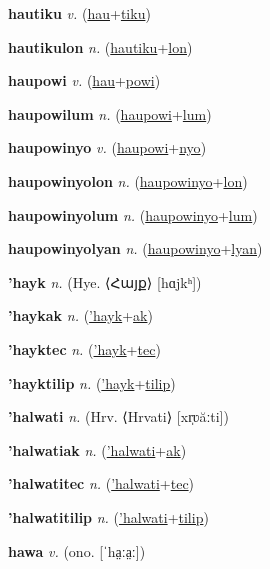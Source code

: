 \textbf{\hypertarget{hautiku}{hautiku}} \textit{v.} (\hyperlink{hau}{hau}+\allowbreak \hyperlink{tiku}{tiku})


\textbf{\hypertarget{hautikulon}{hautikulon}} \textit{n.} (\hyperlink{hautiku}{hautiku}+\allowbreak \hyperlink{lon}{lon})


\textbf{\hypertarget{haupowi}{haupowi}} \textit{v.} (\hyperlink{hau}{hau}+\allowbreak \hyperlink{powi}{powi})


\textbf{\hypertarget{haupowilum}{haupowilum}} \textit{n.} (\hyperlink{haupowi}{haupowi}+\allowbreak \hyperlink{lum}{lum})


\textbf{\hypertarget{haupowinyo}{haupowinyo}} \textit{v.} (\hyperlink{haupowi}{haupowi}+\allowbreak \hyperlink{nyo}{nyo})


\textbf{\hypertarget{haupowinyolon}{haupowinyolon}} \textit{n.} (\hyperlink{haupowinyo}{haupowinyo}+\allowbreak \hyperlink{lon}{lon})


\textbf{\hypertarget{haupowinyolum}{haupowinyolum}} \textit{n.} (\hyperlink{haupowinyo}{haupowinyo}+\allowbreak \hyperlink{lum}{lum})


\textbf{\hypertarget{haupowinyolyan}{haupowinyolyan}} \textit{n.} (\hyperlink{haupowinyo}{haupowinyo}+\allowbreak \hyperlink{lyan}{lyan})


\textbf{\hypertarget{'hayk}{'hayk}} \textit{n.} (Hye. ⟨{\armenian{}Հայք}⟩ [hɑjkʰ])


\textbf{\hypertarget{'haykak}{'haykak}} \textit{n.} (\hyperlink{'hayk}{'hayk}+\allowbreak \hyperlink{ak}{ak})


\textbf{\hypertarget{'hayktec}{'hayktec}} \textit{n.} (\hyperlink{'hayk}{'hayk}+\allowbreak \hyperlink{tec}{tec})


\textbf{\hypertarget{'hayktilip}{'hayktilip}} \textit{n.} (\hyperlink{'hayk}{'hayk}+\allowbreak \hyperlink{tilip}{tilip})


\textbf{\hypertarget{'halwati}{'halwati}} \textit{n.} (Hrv. ⟨Hrvati⟩ [xr̩ʋăːti])


\textbf{\hypertarget{'halwatiak}{'halwatiak}} \textit{n.} (\hyperlink{'halwati}{'halwati}+\allowbreak \hyperlink{ak}{ak})


\textbf{\hypertarget{'halwatitec}{'halwatitec}} \textit{n.} (\hyperlink{'halwati}{'halwati}+\allowbreak \hyperlink{tec}{tec})


\textbf{\hypertarget{'halwatitilip}{'halwatitilip}} \textit{n.} (\hyperlink{'halwati}{'halwati}+\allowbreak \hyperlink{tilip}{tilip})


\textbf{\hypertarget{hawa}{hawa}} \textit{v.} (ono. [ˈha̤ːa̤ː])


